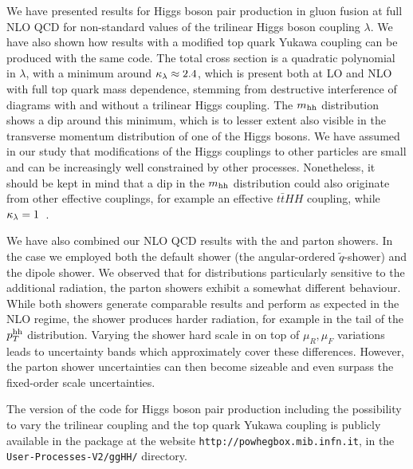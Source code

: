 We have presented results for Higgs boson pair production in gluon
fusion at full NLO QCD for non-standard values of the trilinear Higgs
boson coupling $\lambda$. We have also shown how results with a modified 
top quark Yukawa coupling can be produced with the same code.
The total cross section is a quadratic
polynomial in $\lambda$, with a minimum around $\kappa_{\lambda}\approx 2.4$,
which is present both at LO and NLO with full top quark mass
dependence, stemming from destructive interference of diagrams with
and without a trilinear Higgs coupling. 
The $m_{\mathrm{hh}}$ distribution shows a dip around this minimum, which is to
lesser extent also visible in the transverse momentum distribution of
one of the Higgs bosons. 
We have assumed in our study that modifications of the Higgs couplings
to other particles are small and can be increasingly well constrained by
other processes. Nonetheless, it should be kept in mind that a dip in
the $m_{\mathrm{hh}}$ distribution could also originate from other effective
couplings, for example an effective $t\bar{t}HH$ coupling, while
$\kappa_{\lambda}= 1$~\cite{Buchalla:2018yce}.

We have also combined our NLO QCD results with the \pythia and \herwig
parton showers. In the \herwig case we employed both the default 
shower (the angular-ordered $\tilde{q}$-shower) and the dipole shower.
We observed that for distributions particularly sensitive to the 
additional radiation, the parton showers exhibit a somewhat different 
behaviour. While both \herwig showers generate comparable results and 
perform as expected in the NLO regime, the \pythia shower produces harder 
radiation, for example in the tail of the $p_T^{\mathrm{hh}}$
distribution. Varying the shower hard scale in \herwig on top of
$\mu_R,\mu_F$ variations leads to
uncertainty bands which approximately cover these 
differences. However, the parton shower uncertainties 
can then become sizeable and even surpass the fixed-order scale uncertainties.

The \powheg{} version of the code for Higgs boson pair production
including the possibility to vary the trilinear coupling 
and the top quark Yukawa coupling 
is publicly available in the  package at the website
{\tt http://powhegbox.mib.infn.it}, in the
{\tt User-Processes-V2/ggHH/} directory.
